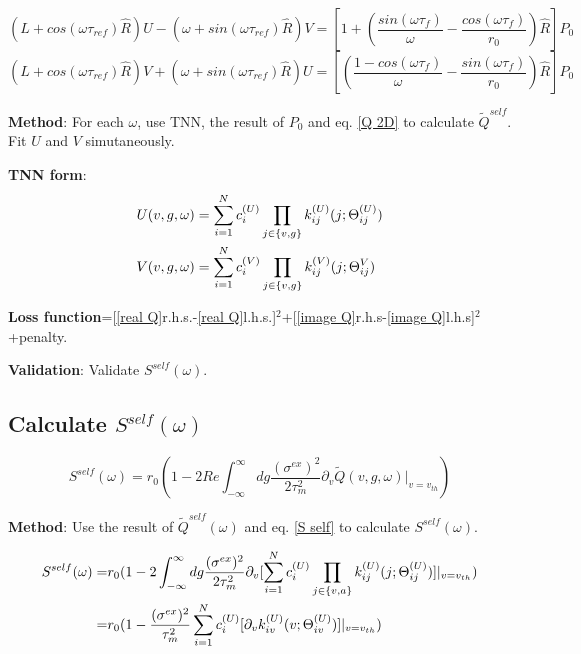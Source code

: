 \documentclass{article}
\begin{document}
	\begin{equation}
		(\hat{L}+cos(\omega\tau_{ref})\hat{R})U-(\omega+sin(\omega\tau_{ref})\hat{R})V=[1+(\frac{sin(\omega\tau_f)}{\omega}-\frac{cos(\omega\tau_f)}{r_0})\hat{R}]P_0
		\label{real Q}
	\end{equation}
	\begin{equation}
		(\hat{L}+cos(\omega\tau_{ref})\hat{R})V+(\omega+sin(\omega\tau_{ref})\hat{R})U=[(\frac{1-cos(\omega\tau_f)}{\omega}-\frac{sin(\omega\tau_f)}{r_0})\hat{R}]P_0
		\label{image Q}
    \end{equation}
	
		\textbf{Method}: For each $\omega$, use TNN, the result of $P_0$ and eq. \eqref{Q 2D} to calculate $\tilde{Q}^{self}$. Fit $U$ and $V$ simutaneously. 
		
	\textbf{TNN form}:
	\begin{align} U(v,g,\omega)&=\sum_{i=1}^{N}c_i^{(U)}\prod_{j\in\{v,g\}}k_{ij}^{(U)}(j;\Theta_{ij}^{(U)})\notag\\
	V(v,g,\omega)&=\sum_{i=1}^{N}c_i^{(V)}\prod_{j\in\{v,g\}}k_{ij}^{(V)}(j;\Theta_{ij}^{V})
	\end{align}
	
	\textbf{Loss function}=[\eqref{real Q}r.h.s.-\eqref{real Q}l.h.s.]$^2$+[\eqref{image Q}r.h.s-\eqref{image Q}l.h.s]$^2$+penalty.
	
	\textbf{Validation}: Validate $S^{self}(\omega)$.
	
	\subsection{Calculate $S^{self}(\omega)$}
	\begin{equation}
		S^{self}(\omega)=r_0(1-2Re\int_{-\infty}^{\infty}dg\frac{(\sigma^{ex})^2}{2\tau_m^2}\partial_v\tilde{Q}(v,g,\omega)|_{v=v_{th}})		
		\label{S self}
	\end{equation}
	
	\textbf{Method}: Use the result of $\tilde{Q}^{self}(\omega)$ and eq. \eqref{S self} to calculate $S^{self}(\omega)$.
	
	\begin{align}
		S^{self}(\omega)=&r_0(1-2\int_{-\infty}^{\infty}dg\frac{(\sigma^{ex})^2}{2\tau_m^2}\partial_v[\sum_{i=1}^{N}c_i^{(U)}\prod_{j\in\{v,a\}}k_{ij}^{(U)}(j;\Theta_{ij}^{(U)})]|_{v=v_{th}})\notag\\
		=&r_0(1-\frac{(\sigma^{ex})^2}{\tau_m^2}\sum_{i=1}^{N}c_i^{(U)}[\partial_vk_{iv}^{(U)}(v;\Theta_{iv}^{(U)})]|_{v=v_{th}})
	\end{align}
	
\end{document}
